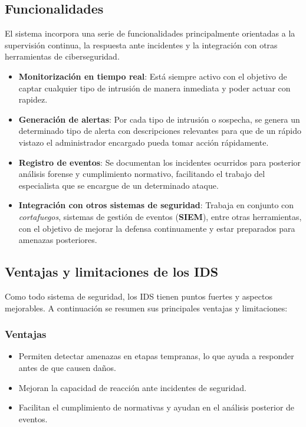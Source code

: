 \documentclass[11pt,a4paper,twoside]{report}
\begin{document}
\subsection{Funcionalidades}

El sistema incorpora una serie de funcionalidades principalmente orientadas a la supervisión continua, la respuesta ante incidentes y la integración con otras herramientas de ciberseguridad.

\begin{itemize}
	\item \textbf{Monitorización en tiempo real}: Está siempre activo con el objetivo de captar cualquier tipo de intrusión de manera inmediata y poder actuar con rapidez.
	
	\item \textbf{Generación de alertas}: Por cada tipo de intrusión o sospecha, se genera un determinado tipo de alerta con descripciones relevantes para que de un rápido vistazo el administrador encargado pueda tomar acción rápidamente.
	
	\item \textbf{Registro de eventos}: Se documentan los incidentes ocurridos para posterior análisis forense y cumplimiento normativo, facilitando el trabajo del especialista que se encargue de un determinado ataque.
	
	\item \textbf{Integración con otros sistemas de seguridad}: Trabaja en conjunto con \textit{cortafuegos}, sistemas de gestión de eventos (\textbf{SIEM}), entre otras herramientas, con el objetivo de mejorar la defensa continuamente y estar preparados para amenazas posteriores.
\end{itemize}




\subsection{Ventajas y limitaciones de los IDS}

Como todo sistema de seguridad, los IDS tienen puntos fuertes y aspectos mejorables. A continuación se resumen sus principales ventajas y limitaciones:

\subsubsection{Ventajas}

\begin{itemize}
	\item Permiten detectar amenazas en etapas tempranas, lo que ayuda a responder antes de que causen daños.
	\item Mejoran la capacidad de reacción ante incidentes de seguridad.
	\item Facilitan el cumplimiento de normativas y ayudan en el análisis posterior de eventos.
\end{itemize}
\end{document}
